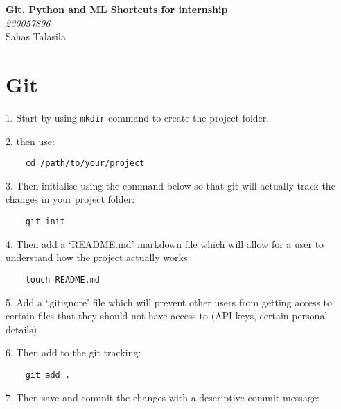 


\date{}




\onehalfspacing
\begin{titlepage}
    \centering
    \vspace*{2cm}
    \Huge{\textbf{Git, Python and ML Shortcuts for internship}} \\[1.5cm]
    \Large{\textit{230057896}\\
    Sahas Talasila} \\[1cm]
    \vfill
\end{titlepage}

\tableofcontents
\newpage

\section{Git}

1. Start by using \verb|mkdir| command to create the project folder.

2. then use:

\begin{lstlisting}
    cd /path/to/your/project
\end{lstlisting}

3. Then initialise using the command below so that git will actually track the changes in your project folder:

\begin{lstlisting}
    git init
\end{lstlisting}

4. Then add a `README.md' markdown file which will allow for a user to understand how the project actually works:

\begin{lstlisting}
    touch README.md
\end{lstlisting}

5. Add a `.gitignore' file which will prevent other users from getting access to certain files that they should not have access to (API keys, certain personal details)

6. Then add to the git tracking:

\begin{lstlisting}
    git add .
\end{lstlisting}

7. Then save and commit the changes with a descriptive commit message:

